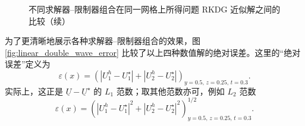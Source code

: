 \begin{figure}[h!]
\ContinuedFloat
\begin{centering}
\par\end{centering}
\begin{centering}
\par\end{centering}
\caption{不同求解器–限制器组合在同一网格上所得问题
RKDG 近似解之间的比较（续）}
\end{figure}

为了更清晰地展示各种求解器–限制器组合的效果，图 \ref{fig:linear_double_wave_error} 比较了以上四种数值解的绝对误差。这里的“绝对误差”定义为
\begin{equation}
\varepsilon(x)=\left(\left|U_{1}^{h}-U_{1}^{\star}\right|+\left|U_{2}^{h}-U_{2}^{\star}\right|\right)_{y=0.5,\,z=0.25,\,t=0.3}.
\end{equation}
实际上，这正是 $\underline{U}-\underline{U}^{\star}$ 的 $L_{1}$ 范数；取其他范数亦可，例如
$L_{2}$ 范数
\begin{equation}
\varepsilon(x)=\left(\left|U_{1}^{h}-U_{1}^{\star}\right|^{2}+\left|U_{2}^{h}-U_{2}^{\star}\right|^{2}\right)_{y=0.5,\,z=0.25,\,t=0.3}^{1/2}.
\end{equation}

